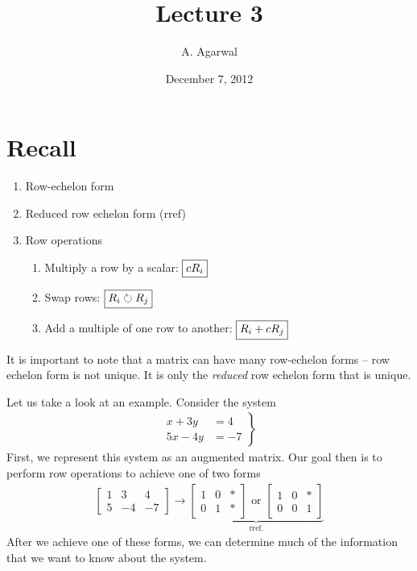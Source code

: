 \documentclass[11pt]{article}
\title{Lecture 3}
\author{A. Agarwal}
\date{December 7, 2012}
\newcommand{\boxit}[2]{\textcolor{#1}{\boxed{\textcolor{black}{#2}}}}
\begin{document}

\section*{Recall}

\begin{enumerate}
\item{
Row-echelon form
}
\item{
Reduced row echelon form (rref)
}
\item{
Row operations
\begin{enumerate}
\item{
Multiply a row by a scalar: $\boxit{black}{cR_i}$
}
\item{
Swap rows: $\boxit{black}{R_i \circlearrowright R_j}$
}
\item{
Add a multiple of one row to another: $\boxit{black}{R_i + cR_j}$
}
\end{enumerate}
}
\end{enumerate}

It is important to note that a matrix can have many row-echelon forms -- row echelon form is not unique. It is only the \emph{reduced} row echelon form that is unique.

Let us take a look at an example. Consider the system
\begin{align*}
\left.
\begin{aligned}
x + 3y &= 4
\\
5x - 4y &= -7
\end{aligned}
\right\}
\end{align*}
First, we represent this system as an augmented matrix. Our goal then is to perform row operations to achieve one of two forms
\begin{align*}
\left[\begin{matrix}
1 & 3 & 4
\\
5 & -4 & -7
\end{matrix}\right]
\longrightarrow
\underbrace{
\left[\begin{matrix}
1 & 0 & *
\\
0 & 1 & *
\end{matrix}\right]
\text{ or }
\left[\begin{matrix}
1 & 0 & *
\\
0 & 0 & 1
\end{matrix}\right]
}_{\text{rref.}}
\end{align*}
After we achieve one of these forms, we can determine much of the information that we want to know about the system.
\end{document}

